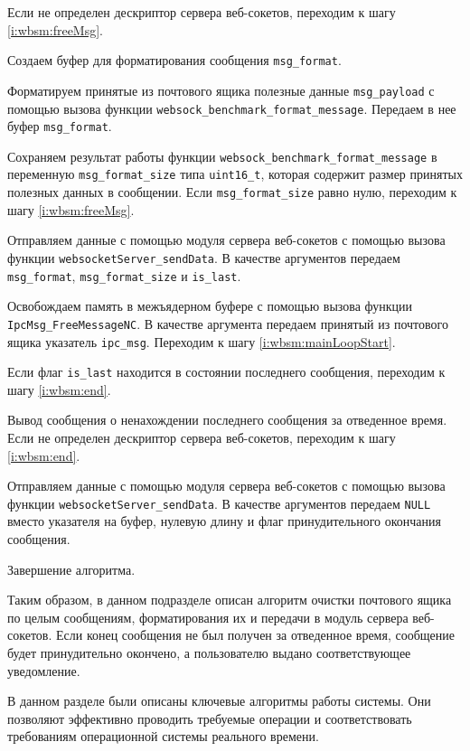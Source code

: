 \begin{enumerate_step}
    \item \label{i:wbsm:sendMsg} Если не определен дескриптор сервера веб-сокетов,
    переходим к шагу \ref{i:wbsm:freeMsg}.
    \item Создаем буфер для форматирования сообщения \verb|msg_format|.
    \item Форматируем принятые из почтового ящика полезные данные \verb|msg_payload|
    с помощью вызова функции \verb|websock_benchmark_format_message|. Передаем
    в нее буфер \verb|msg_format|.
    \item Сохраняем результат работы функции \verb|websock_benchmark_format_message|
    в переменную \verb|msg_format_size| типа \verb|uint16_t|,
    которая содержит размер принятых полезных данных в сообщении. Если
    \verb|msg_format_size| равно нулю, переходим к шагу \ref{i:wbsm:freeMsg}.
    \item Отправляем данные с помощью модуля сервера веб-сокетов с помощью
    вызова функции \verb|websocketServer_sendData|. В качестве аргументов
    передаем \verb|msg_format|, \verb|msg_format_size| и \verb|is_last|.
    \item \label{i:wbsm:freeMsg} Освобождаем память в межъядерном буфере с
    помощью вызова функции \verb|IpcMsg_FreeMessageNC|. В качестве аргумента
    передаем принятый из почтового ящика указатель \verb|ipc_msg|. Переходим
    к шагу \ref{i:wbsm:mainLoopStart}.
    \item \label{i:wbsm:exitCheck} Если флаг \verb|is_last| находится в состоянии
    последнего сообщения, переходим к шагу \ref{i:wbsm:end}.
    \item Вывод сообщения о ненахождении последнего сообщения за отведенное время.
    Если не определен дескриптор сервера веб-сокетов, переходим к шагу
    \ref{i:wbsm:end}.
    \item Отправляем данные с помощью модуля сервера веб-сокетов с помощью
    вызова функции \verb|websocketServer_sendData|. В качестве аргументов
    передаем \verb|NULL| вместо указателя на буфер, нулевую длину и
    флаг принудительного окончания сообщения.
    \item \label{i:wbsm:end} Завершение алгоритма.
\end{enumerate_step}

Таким образом, в данном подразделе описан алгоритм очистки почтового ящика по
целым сообщениям, форматирования их и передачи в модуль сервера веб-сокетов.
Если конец сообщения не был получен за отведенное время,
сообщение будет принудительно окончено, а пользователю выдано соответствующее
уведомление.

В данном разделе были описаны ключевые алгоритмы работы системы. Они позволяют
эффективно проводить требуемые операции и соответствовать требованиям операционной
системы реального времени.
